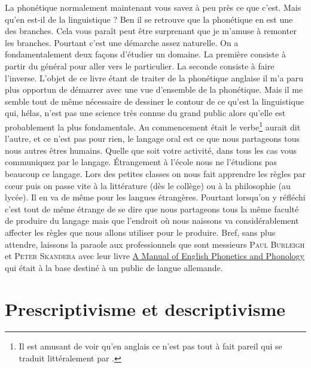 La phonétique normalement maintenant vous savez à peu près ce que
c'est. Mais qu'en est-il de la linguistique ? Ben il se retrouve que
la phonétique en est une des branches. Cela vous paraît peut être
surprenant que je m'amuse à remonter les branches. Pourtant c'est une
démarche assez naturelle. On a fondamentalement deux façons d'étudier
un domaine. La première consiste à partir du général pour aller vers
le particulier. La seconde consiste à faire l'inverse. L'objet de ce
livre étant de traiter de la phonétique anglaise il m'a paru plus
opportun de démarrer avec une vue d'ensemble de la phonétique. Mais il
me semble tout de même nécessaire de dessiner le contour de ce qu'est
la linguistique qui, hélas, n'est pas une science très connue du grand
public alors qu'elle est probablement la plus fondamentale. Au
commencement était le verbe\footnote{Il est amusant de voir qu'en
  anglais ce n'est pas tout à fait pareil  qui se traduit littéralement par .} aurait dit l'autre, et ce n'est pas pour
rien, le langage oral est ce que nous partageons tous nous autres
êtres humains. Quelle que soit votre activité, dans tous les cas vous
communiquez par le langage. \'Etrangement à l'école nous ne l'étudions
pas beaucoup ce langage. Lors des petites classes on nous fait
apprendre les règles par c{\oe}ur puis on passe vite à la littérature
(dès le collège) ou à la philosophie (au lycée). Il en va de même pour
les langues étrangères. Pourtant lorsqu'on y réfléchi c'est tout de
même étrange de se dire que nous partageons tous la même faculté de
produire du langage mais que l'endroit où nous naissons va
considérablement affecter les règles que nous allons utiliser pour le
produire. Bref, sans plus attendre, laissons la paraole aux
professionnels que sont messieurs \textsc{Paul Burleigh} et
\textsc{Peter Skandera} avec leur livre
\href{https://amzn.to/2HV8BzG}{A Manual of English Phonetics and
  Phonology} qui était à la base destiné à un public de langue
allemande.

\section{Prescriptivisme et descriptivisme}

